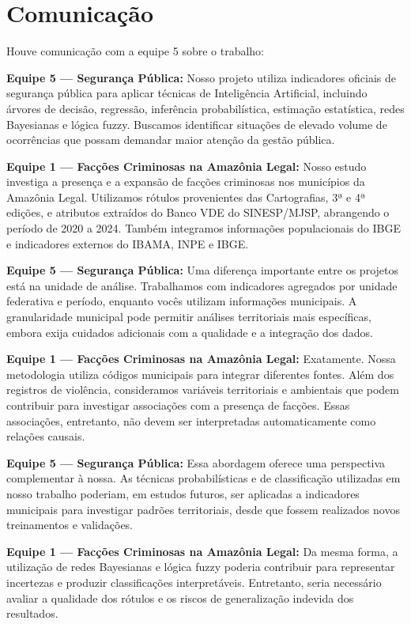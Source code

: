 \documentclass[article,12pt,oneside,a4paper,brazil,sumario=tradicional]{abntex2}
\begin{document}
\section{Comunicação}

Houve comunicação com a equipe 5 sobre o trabalho:

\medskip
\noindent\textbf{Equipe 5 --- Segurança Pública:} Nosso projeto utiliza indicadores oficiais
de segurança pública para aplicar técnicas de Inteligência Artificial, incluindo árvores de
decisão, regressão, inferência probabilística, estimação estatística, redes Bayesianas e
lógica fuzzy. Buscamos identificar situações de elevado volume de ocorrências que possam
demandar maior atenção da gestão pública.

\smallskip
\noindent\textbf{Equipe 1 --- Facções Criminosas na Amazônia Legal:} Nosso estudo investiga a
presença e a expansão de facções criminosas nos municípios da Amazônia Legal. Utilizamos rótulos
provenientes das Cartografias, 3ª e 4ª edições, e atributos extraídos do Banco VDE do
SINESP/MJSP, abrangendo o período de 2020 a 2024. Também integramos informações
populacionais do IBGE e indicadores externos do IBAMA, INPE e IBGE.

\smallskip
\noindent\textbf{Equipe 5 --- Segurança Pública:} Uma diferença importante entre os projetos
está na unidade de análise. Trabalhamos com indicadores agregados por unidade federativa e
período, enquanto vocês utilizam informações municipais. A granularidade municipal pode
permitir análises territoriais mais específicas, embora exija cuidados adicionais com a
qualidade e a integração dos dados.

\smallskip
\noindent\textbf{Equipe 1 --- Facções Criminosas na Amazônia Legal:} Exatamente. Nossa metodologia
utiliza códigos municipais para integrar diferentes fontes. Além dos registros de violência,
consideramos variáveis territoriais e ambientais que podem contribuir para investigar
associações com a presença de facções. Essas associações, entretanto, não devem ser
interpretadas automaticamente como relações causais.

\smallskip
\noindent\textbf{Equipe 5 --- Segurança Pública:} Essa abordagem oferece uma perspectiva
complementar à nossa. As técnicas probabilísticas e de classificação utilizadas em nosso
trabalho poderiam, em estudos futuros, ser aplicadas a indicadores municipais para
investigar padrões territoriais, desde que fossem realizados novos treinamentos e
validações.

\smallskip
\noindent\textbf{Equipe 1 --- Facções Criminosas na Amazônia Legal:} Da mesma forma, a utilização
de redes Bayesianas e lógica fuzzy poderia contribuir para representar incertezas e produzir
classificações interpretáveis. Entretanto, seria necessário avaliar a qualidade dos rótulos
e os riscos de generalização indevida dos resultados.
\end{document}
